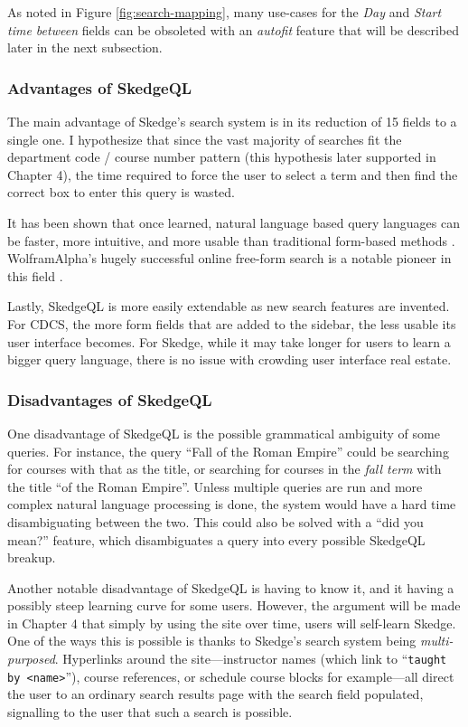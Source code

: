 \doublespacing

\noindent As noted in Figure \ref{fig:search-mapping}, many use-cases for the \emph{Day} and \emph{Start time between} fields can be obsoleted with an \emph{autofit} feature that will be described later in the next subsection.

  \subsubsection{Advantages of SkedgeQL}

    The main advantage of Skedge's search system is in its reduction of 15 fields to a single one. I hypothesize that since the vast majority of searches fit the department code / course number pattern (this hypothesis later supported in Chapter 4), the time required to force the user to select a term and then find the correct box to enter this query is wasted.

    It has been shown that once learned, natural language based query languages can be faster, more intuitive, and more usable than traditional form-based methods \cite{dsl}. WolframAlpha's hugely successful online free-form search is a notable pioneer in this field \cite{wolfram}.

    Lastly, SkedgeQL is more easily extendable as new search features are invented. For CDCS, the more form fields that are added to the sidebar, the less usable its user interface becomes. For Skedge, while it may take longer for users to learn a bigger query language, there is no issue with crowding user interface real estate.
  
  \subsubsection{Disadvantages of SkedgeQL}

    One disadvantage of SkedgeQL is the possible grammatical ambiguity of some queries. For instance, the query ``Fall of the Roman Empire'' could be searching for courses with that as the title, or searching for courses in the \emph{fall term} with the title ``of the Roman Empire''. Unless multiple queries are run and more complex natural language processing is done, the system would have a hard time disambiguating between the two. This could also be solved with a ``did you mean?'' feature, which disambiguates a query into every possible SkedgeQL breakup.
    
    Another notable disadvantage of SkedgeQL is having to know it, and it having a possibly steep learning curve for some users. However, the argument will be made in Chapter 4 that simply by using the site over time, users will self-learn Skedge. One of the ways this is possible is thanks to Skedge's search system being \emph{multi-purposed}. Hyperlinks around the site---instructor names (which link to ``{\tt taught by <name>}''), course references, or schedule course blocks for example---all direct the user to an ordinary search results page with the search field populated, signalling to the user that such a search is possible.


